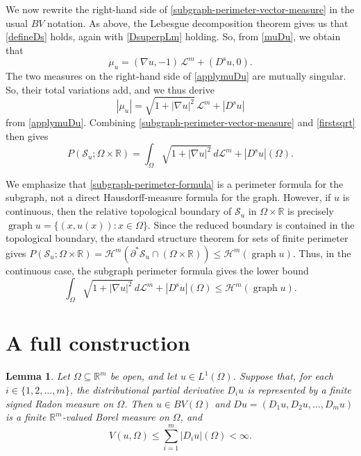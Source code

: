 \documentclass{publicadapt}
\newtheorem{lemma}{Lemma}%
\begin{document}
We now rewrite the right-hand side of
\eqref{subgraph-perimeter-vector-measure} in the usual \(BV\) notation. As above, the
Lebesgue decomposition theorem gives us that \eqref{defineDs} holds, 
 again with \eqref{DsuperpLm} holding. 
 So, from \eqref{muDu}, we obtain that 
\begin{equation}\label{applymuDu}
\mu_u
=
(\nabla u,-1)\,\mathcal L^m
+
(D^{\operatorname{s}}u,0).
\end{equation}
 The two measures on the right-hand side of \eqref{applymuDu} are mutually singular. So, 
their total variations add, and we thus derive 
\begin{equation}\label{firstsqrt}
 |\mu_u|
=
\sqrt{1+|\nabla u|^2}\,\mathcal L^m
+
|D^{\operatorname{s}}u| 
\end{equation}
 from \eqref{applymuDu}. 
Combining \eqref{subgraph-perimeter-vector-measure} and \eqref{firstsqrt} then gives
\begin{equation}\label{subgraph-perimeter-formula}
P(\mathcal S_u;\Omega\times\mathbb R)
=
\int_{\Omega}\sqrt{1+|\nabla u|^2}\,d\mathcal L^m
+
|D^{\operatorname{s}}u|(\Omega).
\end{equation}

 We emphasize that \eqref{subgraph-perimeter-formula} is a perimeter formula for the subgraph, not a direct Hausdorff-measure formula for the graph. However, if $u$ is continuous, then 
 the relative topological boundary of
\(\mathcal S_u\) in \(\Omega\times\mathbb R\) is precisely 
 $
\operatorname{graph}u
=
\{(x,u(x)):x\in\Omega\}$. 
Since the reduced boundary is contained in the topological boundary, the
standard structure theorem for sets of finite perimeter gives
$
P(\mathcal S_u;\Omega\times\mathbb R)
=
\mathcal H^m(\partial^*\mathcal S_u\cap(\Omega\times\mathbb R))
\leq
\mathcal H^m(\operatorname{graph}u)$. 
Thus, in the continuous case, the subgraph perimeter formula gives the lower
bound
\begin{equation}\label{subgraph-lower-bound-graph}
\int_{\Omega}\sqrt{1+|\nabla u|^2}\,d\mathcal L^m
+
|D^{\operatorname{s}}u|(\Omega)
\leq
\mathcal H^m(\operatorname{graph}u).
\end{equation}

\section{A full construction}\label{secfull}

\begin{lemma}\label{lem:finite-partials-imply-BV}%
Let \(\Omega\subseteq\mathbb R^m\) be open, and let \(u\in L^1(\Omega)\).
Suppose that, for each \(i\in\{1,2,\ldots,m\}\), the distributional partial
derivative \(D_i u\) is represented by a finite signed Radon measure on
\(\Omega\). Then \(u\in BV(\Omega)\) and 
$
Du=(D_1u,D_2u,\ldots,D_m u)
$ 
is a finite \(\mathbb R^m\)-valued Borel measure on \(\Omega\), and
\[
V(u,\Omega)\leq \sum_{i=1}^m |D_i u|(\Omega)<\infty.
\]
\end{lemma}
\end{document}
